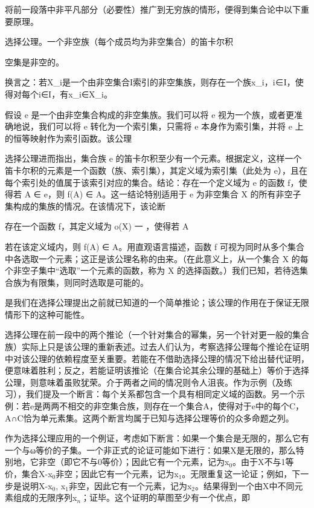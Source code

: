 \documentclass[12pt,a4paper]{ctexbook}
\theoremstyle{definition}
\theoremstyle{remark}
\begin{document}
{将前一段落中非平凡部分（必要性）推广到无穷族的情形，便得到集合论中以下重要原理。

选择公理。一个非空族（每个成员均为非空集合）的笛卡尔积

空集是非空的。

换言之：若{X\_i}是一个由非空集合I索引的非空集族，则存在一个族{x\_i}，i∈I，使得对每个i∈I，有x\_i∈X\_i。

假设 e 是一个由非空集合构成的非空集族。我们可以将 e 视为一个族，或者更准确地说，我们可以将 e 转化为一个索引集，只需将 e 本身作为索引集，并将 e 上的恒等映射作为索引函数。该公理

选择公理进而指出，集合族 e 的笛卡尔积至少有一个元素。根据定义，这样一个笛卡尔积的元素是一个函数（族、索引集），其定义域为索引集（此处为 e），且在每个索引处的值属于该索引对应的集合。结论：存在一个定义域为 e 的函数 f，使得若 A ∈ e，则 f(A) ∈ A。这一结论特别适用于 e 为非空集合 X 的所有非空子集构成的集族的情况。在该情况下，该论断

存在一个函数 f，其定义域为 o(X) 一 { }，使得若 A

若在该定义域内，则 f(A) ∈ A。用直观语言描述，函数 f 可视为同时从多个集合中各选取一个元素；这正是该公理名称的由来。（在此意义上，从一个集合 X 的每个非空子集中“选取”一个元素的函数，称为 X 的选择函数。）我们已知，若待选集合族为有限集，则同时选取是可能的。

是我们在选择公理提出之前就已知道的一个简单推论；该公理的作用在于保证无限情形下的这种可能性。

选择公理在前一段中的两个推论（一个针对集合的幂集，另一个针对更一般的集合族）实际上只是该公理的重新表述。过去人们认为，考察选择公理每个推论在证明中对该公理的依赖程度至关重要。若能在不借助选择公理的情况下给出替代证明，便意味着胜利；反之，若能证明该推论（在集合论其余公理的基础上）等价于选择公理，则意味着虽败犹荣。介于两者之间的情况则令人沮丧。作为示例（及练习），我们提及一个断言：每个关系都包含一个具有相同定义域的函数。另一个示例：若e是两两不相交的非空集合族，则存在一个集合A，使得对于e中的每个C，A∩C恰为单元素集。这两个断言均属于已知与选择公理等价的众多命题之列。

作为选择公理应用的一个例证，考虑如下断言：如果一个集合是无限的，那么它有一个与ω等价的子集。一个非正式的论证可能如下进行：如果X是无限的，那么特别地，它非空（即它不与0等价）；因此它有一个元素，记为x$_{0}$。由于X不与1等价，集合X-{x$_{0}$}非空；因此它有一个元素，记为x$_{1}$。无限重复这一论证；例如，下一步是说明X-{x$_{0}$, x$_{1}$}非空，因此它有一个元素，记为x$_{2}$。结果得到一个由X中不同元素组成的无限序列{x$_{n}$}；证毕。这个证明的草图至少有一个优点，即

}
\end{document}
